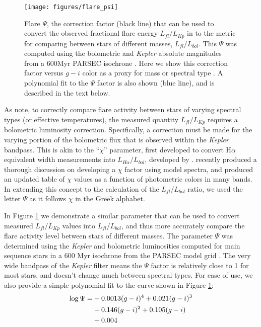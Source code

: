 \documentclass[preprint2]{aastex62}
\newcommand{\Kepler}{\textsl{Kepler}\xspace}
\begin{document}
\begin{figure}[!t]
\centering
\texttt{[image: figures/flare\_psi]}
\caption{
Flare $\Psi$, the correction factor (black line) that can be used to convert the observed fractional flare energy $L_{fl}/L_{Kp}$ in to the metric for comparing between stars of different masses, $L_{fl}/L_{bol}$. This $\Psi$ was computed using the bolometric and \Kepler absolute magnitudes from a 600Myr PARSEC isochrone \citep{bressan2012}. Here we show this correction factor versus $g-i$ color as a proxy for mass or spectral type \citep[e.g. see][]{covey2007,davenport2014}. A polynomial fit to the $\Psi$ factor is also shown (blue line), and is described in the text below.
}
\label{fig:chi}
\end{figure}


As \citet{lurie2015} note, to correctly compare flare activity between stars of varying spectral types (or effective temperatures), the measured quantity $L_{fl}/L_{Kp}$ requires a bolometric luminosity correction. Specifically, a correction must be made for the varying portion of the bolometric flux that is observed within the \Kepler bandpass. This is akin to the ``$\chi$'' parameter, first developed to convert H$\alpha$ equivalent width measurements into  $L_{H\alpha}/L_{bol}$, developed by \citet{walkowicz2004}. \citet{douglas2014} recently produced a thorough discussion on developing a $\chi$ factor using model spectra, and produced an updated table of $\chi$ values as a function of photometric colors in many bands. In extending this concept to the calculation of the $L_{fl}/L_{bol}$ ratio, we used the letter $\Psi$ as it follows $\chi$ in the Greek alphabet.

In Figure \ref{fig:chi} we demonstrate a similar parameter that can be used to convert measured $L_{fl}/L_{Kp}$ values into $L_{fl}/L_{bol}$, and thus more accurately compare the flare activity level between stars of different masses. The parameter $\Psi$ was determined using the \Kepler and bolometric luminosities computed for main sequence stars in a 600 Myr isochrone from the PARSEC model grid \citet{bressan2012}. The very wide bandpass of the \Kepler filter means the $\Psi$ factor is relatively close to 1 for most stars, and doesn't change much between spectral types. For ease of use, we also provide a simple polynomial fit to the curve shown in Figure \ref{fig:chi}:
\begin{eqnarray}
\log \Psi =& -0.0013 (g-i)^4 + 0.021 (g-i)^3 \notag \\
& -0.146 (g-i)^2 + 0.105 (g-i) \notag \\ 
& + 0.004
\end{eqnarray}
\end{document}

